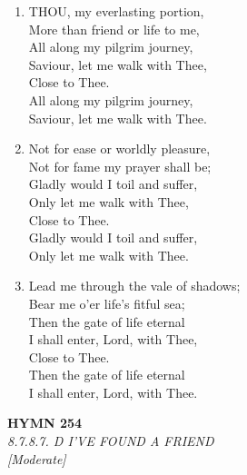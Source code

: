 \documentclass[11pt,a4paper]{article}
\begin{document}
\begin{enumerate}
    \item THOU, my everlasting portion, \\
            More than friend or life to me, \\
        All along my pilgrim journey, \\
            Saviour, let me walk with Thee, \\
                Close to Thee. \\
            All along my pilgrim journey, \\
            Saviour, let me walk with Thee.

    \item Not for ease or worldly pleasure, \\
            Not for fame my prayer shall be; \\
        Gladly would I toil and suffer, \\
            Only let me walk with Thee, \\
                Close to Thee. \\
            Gladly would I toil and suffer, \\
            Only let me walk with Thee.

    \item Lead me through the vale of shadows; \\
            Bear me o'er life's fitful sea; \\
        Then the gate of life eternal \\
            I shall enter, Lord, with Thee, \\
                Close to Thee. \\
            Then the gate of life eternal \\
            I shall enter, Lord, with Thee.

\end{enumerate}

\newpage
\begin{center}
    {\Large \textbf{HYMN 254}}
    \\
    \textit{8.7.8.7. D I'VE FOUND A FRIEND}
    \\
    \textit{\small [Moderate]}
\end{center}
\vspace{1em}
\end{document}
